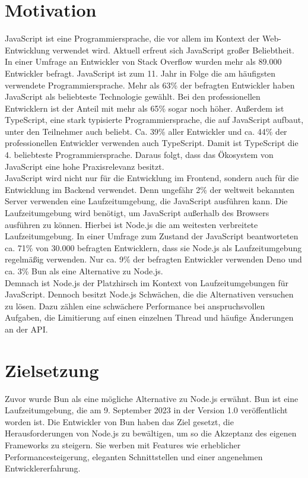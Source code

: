 \pagestyle{fancy-style}

\section{Motivation}
JavaScript ist eine Programmiersprache, die vor allem im Kontext der Web-Entwicklung verwendet wird. Aktuell erfreut sich JavaScript großer Beliebtheit. In einer Umfrage an Entwickler von Stack Overflow wurden mehr als 89.000 Entwickler befragt. JavaScript ist zum 11. Jahr in Folge die am häufigsten verwendete Programmiersprache. Mehr als 63\% der befragten Entwickler haben JavaScript als beliebteste Technologie gewählt. Bei den professionellen Entwicklern ist der Anteil mit mehr als 65\% sogar noch höher. Außerdem ist TypeScript, eine stark typisierte Programmiersprache, die auf 
JavaScript aufbaut, unter den Teilnehmer auch beliebt. Ca. 39\% aller Entwickler und ca. 44\% der professionellen Entwickler verwenden auch TypeScript. Damit ist TypeScript die 4. beliebteste Programmiersprache. Daraus folgt, dass das Ökosystem von JavaScript eine hohe Praxisrelevanz besitzt. \\

\noindent
JavaScript wird nicht nur für die Entwicklung im Frontend, sondern auch für die Entwicklung im Backend 
verwendet. Denn ungefähr 2\% der weltweit bekannten Server verwenden eine Laufzeitumgebung, die JavaScript 
ausführen kann. Die Laufzeitumgebung wird benötigt, um JavaScript außerhalb des Browsers ausführen zu können.
Hierbei ist Node.js die am weitesten verbreitete Laufzeitumgebung. In einer Umfrage zum Zustand der JavaScript
beantworteten ca. 71\% von 30.000 befragten Entwicklern, dass sie Node.js als Laufzeitumgebung regelmäßig verwenden.
Nur ca. 9\% der befragten Entwickler verwenden Deno und ca. 3\% Bun als eine Alternative zu Node.js. \\

\noindent
Demnach ist Node.js der Platzhirsch im Kontext von Laufzeitumgebungen für JavaScript. Dennoch besitzt Node.js Schwächen, die die Alternativen versuchen zu lösen. Dazu zählen eine schwächere Performance bei anspruchsvollen
Aufgaben, die Limitierung auf einen einzelnen Thread und häufige Änderungen an der API.


\section{Zielsetzung}
Zuvor wurde Bun als eine mögliche Alternative zu Node.js erwähnt. Bun ist eine Laufzeitumgebung, die am 9. September 2023 in der Version 1.0 veröffentlicht worden ist. Die Entwickler von Bun haben das Ziel gesetzt, die Herausforderungen von Node.js zu bewältigen, um so die Akzeptanz des eigenen Frameworks zu steigern. Sie werben mit Features wie erheblicher Performancesteigerung, eleganten Schnittstellen und einer angenehmen Entwicklererfahrung. \\

